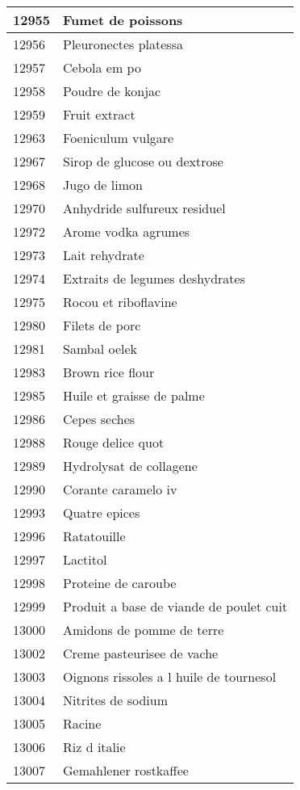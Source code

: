 \begin{longtable}{|l|l|}
12955 & Fumet de poissons \\ \hline 
12956 & Pleuronectes platessa \\ \hline 
12957 & Cebola em po \\ \hline 
12958 & Poudre de konjac \\ \hline 
12959 & Fruit extract \\ \hline 
12963 & Foeniculum vulgare \\ \hline 
12967 & Sirop de glucose ou dextrose \\ \hline 
12968 & Jugo de limon \\ \hline 
12970 & Anhydride sulfureux residuel \\ \hline 
12972 & Arome vodka agrumes \\ \hline 
12973 & Lait rehydrate \\ \hline 
12974 & Extraits de legumes deshydrates \\ \hline 
12975 & Rocou et riboflavine \\ \hline 
12980 & Filets de porc \\ \hline 
12981 & Sambal oelek \\ \hline 
12983 & Brown rice flour \\ \hline 
12985 & Huile et graisse de palme \\ \hline 
12986 & Cepes seches \\ \hline 
12988 & Rouge delice quot \\ \hline 
12989 & Hydrolysat de collagene \\ \hline 
12990 & Corante caramelo iv \\ \hline 
12993 & Quatre epices \\ \hline 
12996 & Ratatouille \\ \hline 
12997 & Lactitol \\ \hline 
12998 & Proteine de caroube \\ \hline 
12999 & Produit a base de viande de poulet cuit \\ \hline 
13000 & Amidons de pomme de terre \\ \hline 
13002 & Creme pasteurisee de vache \\ \hline 
13003 & Oignons rissoles a l huile de tournesol \\ \hline 
13004 & Nitrites de sodium \\ \hline 
13005 & Racine \\ \hline 
13006 & Riz d italie \\ \hline 
13007 & Gemahlener rostkaffee \\ \hline 

\end{longtable}
